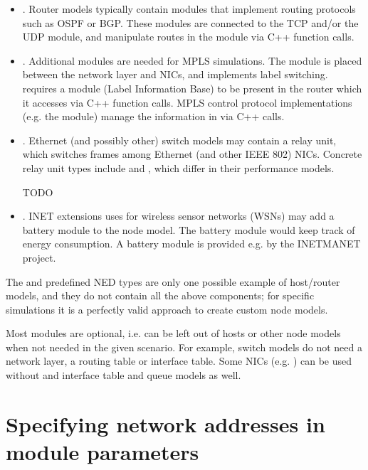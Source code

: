 \begin{itemize}
\item {}. Router models typically contain modules that
implement routing protocols such as OSPF or BGP. These modules are
connected to the TCP and/or the UDP module, and manipulate routes in the
 module via C++ function calls.

\item {}. Additional modules are needed for MPLS
simulations. The  module is placed between the network layer
and NICs, and implements label switching.  requires a
 module (Label Information Base) to be present in the router
which it accesses via C++ function calls. MPLS control protocol
implementations (e.g. the  module) manage the information in
 via C++ calls.

\item {}. Ethernet (and possibly other) switch models may
contain a relay unit, which switches frames among Ethernet (and other
IEEE 802) NICs. Concrete relay unit types include 
and , which differ in their performance models.

\ifdraft TODO
\item {}. INET extensions uses for wireless sensor
networks (WSNs) may add a battery module to the node model. The battery
module would keep track of energy consumption. A battery module is provided
e.g. by the INETMANET project.
\fi

\end{itemize}

The  and  predefined NED types are
only one possible example of host/router models, and they do not contain
all the above components; for specific simulations it is a perfectly
valid approach to create custom node models.

Most modules are optional, i.e. can be left out of hosts or other node
models when not needed in the given scenario. For example, switch models do
not need a network layer, a routing table or interface table. Some NICs (e.g.
) can be used without and interface table and queue models as
well.


\section{Specifying network addresses in module parameters}

